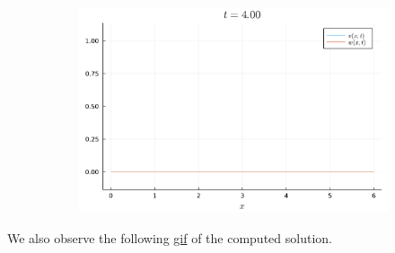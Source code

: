\documentclass{article}
\begin{document}
\begin{figure}[H]
\begin{subfigure}{0.495\linewidth}
	\end{subfigure}
	\begin{subfigure}{0.495\linewidth}
		\centering
		\includegraphics[width=\linewidth]{prob4_t=4.pdf}
	\end{subfigure}
\end{figure}
We also observe the following \href{https://imgur.com/a/XXHi2S8}{gif} of the computed solution.
\end{document}
